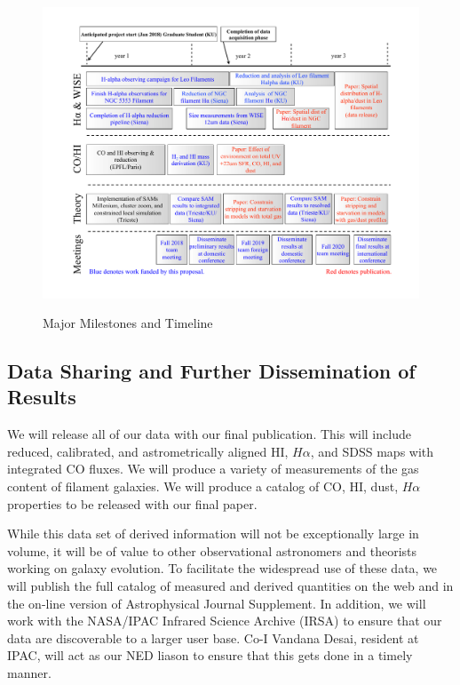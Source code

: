 \documentclass[11pt, preprint]{aastex}
\begin{document}
{\begin{figure}[hb!]
\caption{Major Milestones and Timeline \label{schedule}}
\vspace*{-.4cm}
\includegraphics[width=1.1\textwidth]{work-plan2.pdf}
\label{fig:workplan}
\end{figure}

\vspace*{-.8cm}\subsection{Data Sharing and Further Dissemination of Results }
\vspace*{-.3cm}

We will release all of our data with our final publication.  This will include 
reduced, calibrated, and astrometrically aligned HI,
$H\alpha$, and SDSS maps with integrated CO fluxes.
We will produce a variety of measurements of the gas content of
filament galaxies.  We will produce a catalog of CO, HI, dust, $H\alpha$
properties to be released with our final paper.

While this data set of derived information will not be exceptionally
large in volume, it will be of value to other observational
astronomers and theorists working on galaxy evolution. To facilitate
the widespread use of these data, we will publish the full catalog of
measured and derived quantities on the web and in the on-line version
of Astrophysical Journal Supplement. In addition, we will work with
the NASA/IPAC Infrared Science Archive (IRSA) to ensure that our data are
discoverable to a larger user base. Co-I Vandana Desai, resident at
IPAC, will act as our NED liason to ensure that this gets done in a
timely manner.

}
\end{document}

